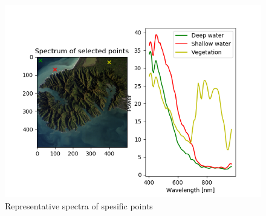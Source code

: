 
\begin{figure}
    \centering
    \includegraphics[width=\textwidth]{../fig/pseudo_rgb_points.png}
    \caption{Representative spectra of spesific points}
    \label{fig:point_spectra}
\end{figure}

